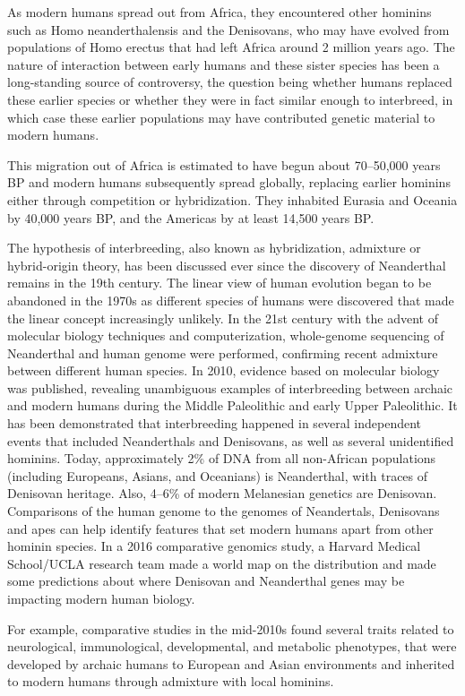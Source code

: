 As modern humans spread out from Africa, they encountered other hominins such as Homo neanderthalensis and the Denisovans, who may have evolved from populations of Homo erectus that had left Africa around 2 million years ago. The nature of interaction between early humans and these sister species has been a long-standing source of controversy, the question being whether humans replaced these earlier species or whether they were in fact similar enough to interbreed, in which case these earlier populations may have contributed genetic material to modern humans.

This migration out of Africa is estimated to have begun about 70--50,000 years BP and modern humans subsequently spread globally, replacing earlier hominins either through competition or hybridization. They inhabited Eurasia and Oceania by 40,000 years BP, and the Americas by at least 14,500 years BP.

The hypothesis of interbreeding, also known as hybridization, admixture or hybrid-origin theory, has been discussed ever since the discovery of Neanderthal remains in the 19th century. The linear view of human evolution began to be abandoned in the 1970s as different species of humans were discovered that made the linear concept increasingly unlikely. In the 21st century with the advent of molecular biology techniques and computerization, whole-genome sequencing of Neanderthal and human genome were performed, confirming recent admixture between different human species. In 2010, evidence based on molecular biology was published, revealing unambiguous examples of interbreeding between archaic and modern humans during the Middle Paleolithic and early Upper Paleolithic. It has been demonstrated that interbreeding happened in several independent events that included Neanderthals and Denisovans, as well as several unidentified hominins. Today, approximately 2\% of DNA from all non-African populations (including Europeans, Asians, and Oceanians) is Neanderthal, with traces of Denisovan heritage. Also, 4--6\% of modern Melanesian genetics are Denisovan. Comparisons of the human genome to the genomes of Neandertals, Denisovans and apes can help identify features that set modern humans apart from other hominin species. In a 2016 comparative genomics study, a Harvard Medical School/UCLA research team made a world map on the distribution and made some predictions about where Denisovan and Neanderthal genes may be impacting modern human biology.

For example, comparative studies in the mid-2010s found several traits related to neurological, immunological, developmental, and metabolic phenotypes, that were developed by archaic humans to European and Asian environments and inherited to modern humans through admixture with local hominins.

